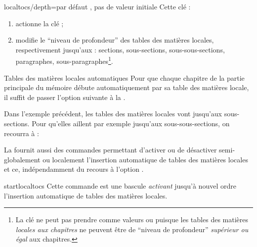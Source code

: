 {%
  \begin{docKey}[][doc
    new=2016-09-29]{localtocs/depth}{=\textbar{}\textbar{}\textbar{}\textbar{}}{par
      défaut , pas de valeur initiale}
    Cette clé :
    \begin{enumerate}
    \item actionne la clé  ;
    \item modifie le \enquote{niveau de profondeur} des tables des matières
      locales, respectivement jusqu'aux : sections, sous-sections,
      sous-sous-sections, paragraphes, sous-paragraphes\footnote{La clé
         ne peut pas prendre comme valeurs
         ou  puisque les tables des matières
        \emph{locales aux chapitres} ne peuvent être de \enquote{niveau de
          profondeur} \emph{supérieur ou égal} aux chapitres.}.
    \end{enumerate}

\end{docKey}
}

\begin{dbexample}{Tables des matières locales automatiques}{}
  Pour que chaque chapitre de la partie principale du mémoire débute
  automatiquement par sa table des matières locale, il suffit de passer l'option
  suivante à la \yatCl{}.
  
  Dans l'exemple précédent, les tables des matières locales vont jusqu'aux
  sous-sections. Pour qu'elles aillent par exemple jusqu'aux sous-sous-sections,
  on recourra à :
\end{dbexample}

La \yatCl{} fournit aussi des commandes permettant d'activer ou de désactiver
semi-globalement ou localement l'insertion automatique de tables des matières
locales et ce, indépendamment du recours à l'option .

\begin{docCommand}[doc new=2016-09-29]{startlocaltocs}{}
  Cette commande est une bascule \emph{activant} jusqu'à nouvel ordre
  l'insertion automatique de tables des matières locales.
\end{docCommand}

